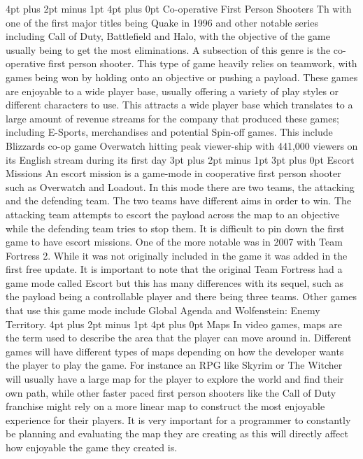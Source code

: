 \documentclass[12pt,a4paper,oneside]{book}
\makeatletter
\renewcommand\subsection{\@startsection {subsection}{1}{2mm} %
                               {3pt plus 2pt minus 1pt} %
                               {3pt plus 0pt} %
                               {\normalfont\bfseries}}
\renewcommand\section{\@startsection {section}{1}{0mm} %
                               {4pt plus 2pt minus 1pt} %
                               {4pt plus 0pt} %
                               {\bfseries}}
\makeatother
\begin{document}
\section{Co-operative First Person Shooters}
Th with one of the first major titles being Quake in 1996 and other notable series including Call of Duty, Battlefield and Halo, with the objective of the game usually being to get the most eliminations. 
\vspace{5mm} 
\newline
A subsection of this genre is the co-operative first person shooter. This type of game heavily relies on teamwork, with games being won by holding onto an objective or pushing a payload. These games are enjoyable to a wide player base, usually offering a variety of play styles or different characters to use. This attracts a wide player base which translates to a large amount of revenue streams for the company that produced these games; including E-Sports, merchandises and potential Spin-off games. This include Blizzards co-op game Overwatch hitting peak viewer-ship with 441,000 viewers on its English stream during its first day \cite{LukeChristou}
\subsection{Escort Missions}
An escort mission is a game-mode in cooperative first person shooter such as Overwatch and Loadout. In this mode there are two teams, the attacking and the defending team. The two teams have different aims in order to win. The attacking team attempts to escort the payload across the map to an objective while the defending team tries to stop them. It is difficult to pin down the first game to have escort missions. One of the more notable was in 2007 with Team Fortress 2. While it was not originally included in the game it was added in the first free update. It is important to note that the original Team Fortress had a game mode called Escort but this has many differences with its sequel, such as the payload being a controllable player and there being three teams. Other games that use this game mode include Global Agenda and Wolfenstein: Enemy Territory.    
\vspace{5mm} 
\newline
\section{Maps}
In video games, maps are the term used to describe the area that the player can move around in. Different games will have different types of maps depending on how the developer wants the player to play the game. For instance an RPG like Skyrim or The Witcher will usually have a large map for the player to explore the world and find their own path, while other faster paced first person shooters like the Call of Duty franchise might rely on a more linear map to construct the most enjoyable experience for their players. It is very important for a programmer to constantly be planning and evaluating the map they are creating as this will directly affect how enjoyable the game they created is.
\vspace{5mm} 
\newline
\end{document}
